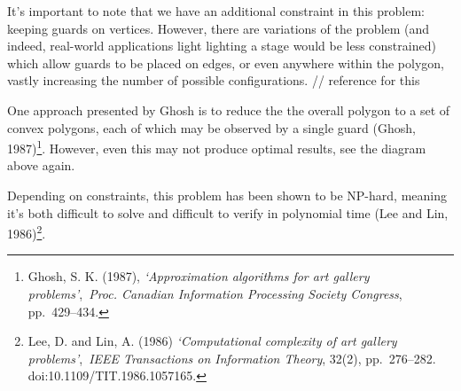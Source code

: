 \documentclass[
]{article}
\begin{document}
It's important to note that we have an additional constraint in this
problem: keeping guards on vertices. However, there are variations of
the problem (and indeed, real-world applications light lighting a stage
would be less constrained) which allow guards to be placed on edges, or
even anywhere within the polygon, vastly increasing the number of
possible configurations. // reference for this

One approach presented by Ghosh is to reduce the the overall polygon to
a set of convex polygons, each of which may be observed by a single
guard (Ghosh, 1987)\footnote{Ghosh, S. K. (1987), \emph{`Approximation
  algorithms for art gallery problems'},~\emph{Proc. Canadian
  Information Processing Society Congress}, pp.~429--434.}. However,
even this may not produce optimal results, see the diagram above again.

Depending on constraints, this problem has been shown to be NP-hard,
meaning it's both difficult to solve and difficult to verify in
polynomial time (Lee and Lin, 1986)\footnote{Lee, D. and Lin, A. (1986)
  \emph{`Computational complexity of art gallery problems'},~\emph{IEEE
  Transactions on Information Theory}, 32(2), pp.~276--282.
  doi:10.1109/TIT.1986.1057165.}.
\end{document}
